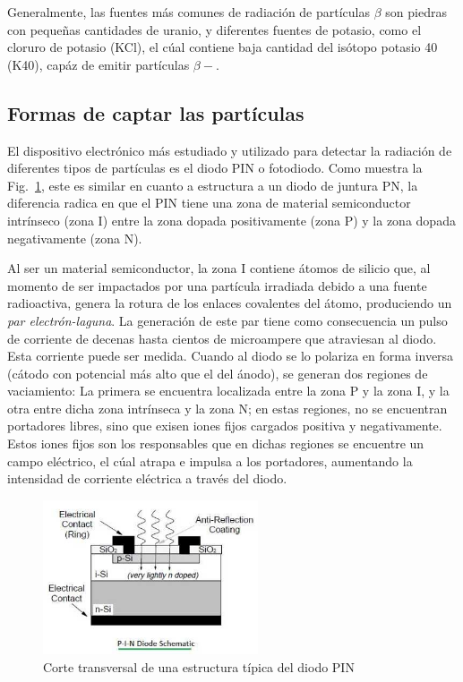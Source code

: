 \documentclass[a4paper,conference]{IEEEtran}
\begin{document}
        Generalmente, las fuentes más comunes de radiación de partículas $\beta$
        son piedras con pequeñas cantidades de uranio, y diferentes fuentes de
        potasio, como el cloruro de potasio (KCl), el cúal contiene baja
        cantidad del isótopo potasio 40 (K40), capáz de emitir partículas
        $\beta-$.

    \subsection{Formas de captar las partículas}
       El dispositivo electrónico más estudiado y utilizado para detectar la
       radiación de diferentes tipos de partículas es el diodo PIN o fotodiodo.
       Como muestra la Fig.~\ref{fig:pin}, este es similar en cuanto a
       estructura a un diodo de juntura PN, la diferencia radica en que el PIN
       tiene una zona de material semiconductor intrínseco (zona I) entre la
       zona dopada positivamente (zona P) y la zona dopada negativamente (zona
       N).\par Al ser un material semiconductor, la zona I contiene átomos de
       silicio que, al momento de ser impactados por una partícula irradiada
       debido a una fuente radioactiva, genera la rotura de los enlaces
       covalentes del átomo, produciendo un \emph{par electrón-laguna}. La
       generación de este par tiene como consecuencia un pulso de corriente de
       decenas hasta cientos de microampere que atraviesan al diodo. Esta
       corriente puede ser medida. Cuando al diodo se lo polariza en
       forma inversa (cátodo con potencial más alto que el del ánodo),
       se generan dos regiones de vaciamiento: La primera se encuentra
       localizada entre la zona P y la zona I, y la otra entre dicha zona
       intrínseca y la zona N; en estas regiones, no se encuentran portadores
       libres, sino que exisen iones fijos cargados positiva y negativamente.
       Estos iones fijos son los responsables que en dichas regiones se encuentre
       un campo eléctrico, el cúal atrapa e impulsa a los portadores, aumentando
       la intensidad de corriente eléctrica a través del diodo.
       \newpage
       \begin{figure}[!t]
           \centering
           \includegraphics[width=2.5in]{img/PIN_structure.jpg}
           \caption{Corte transversal de una estructura típica del diodo PIN}
           \label{fig:pin}
       \end{figure}
\end{document}
